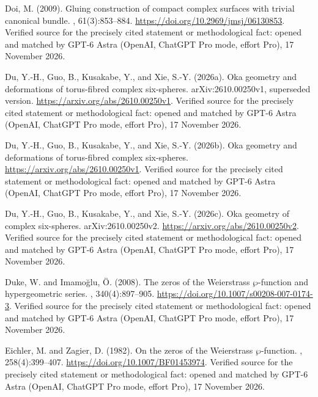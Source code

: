 \begin{thebibliography}{}
Doi, M. (2009).
\newblock Gluing construction of compact complex surfaces with trivial
  canonical bundle.
, 61(3):853--884.
\newblock \url{https://doi.org/10.2969/jmsj/06130853}. Verified source for the precisely cited statement or methodological fact: opened and matched by GPT-6 Astra (OpenAI, ChatGPT Pro mode, effort Pro), 17 November 2026.

Du, Y.-H., Guo, B., Kusakabe, Y., and Xie, S.-Y. (2026a).
\newblock Oka geometry and deformations of torus-fibred complex six-spheres.
\newblock arXiv:2610.00250v1, superseded version.
\newblock \url{https://arxiv.org/abs/2610.00250v1}. Verified source for the precisely cited statement or methodological fact: opened and matched by GPT-6 Astra (OpenAI, ChatGPT Pro mode, effort Pro), 17 November 2026.

Du, Y.-H., Guo, B., Kusakabe, Y., and Xie, S.-Y. (2026b).
\newblock Oka geometry and deformations of torus-fibred complex six-spheres.
\newblock \url{https://arxiv.org/abs/2610.00250v1}. Verified source for the precisely cited statement or methodological fact: opened and matched by GPT-6 Astra (OpenAI, ChatGPT Pro mode, effort Pro), 17 November 2026.

Du, Y.-H., Guo, B., Kusakabe, Y., and Xie, S.-Y. (2026c).
\newblock Oka geometry of complex six-spheres.
\newblock arXiv:2610.00250v2.
\newblock \url{https://arxiv.org/abs/2610.00250v2}. Verified source for the precisely cited statement or methodological fact: opened and matched by GPT-6 Astra (OpenAI, ChatGPT Pro mode, effort Pro), 17 November 2026.

Duke, W. and Imamo{\u g}lu, {\"O}. (2008).
\newblock The zeros of the {Weierstrass} {$\wp$}-function and hypergeometric
  series.
, 340(4):897--905.
\newblock \url{https://doi.org/10.1007/s00208-007-0174-3}. Verified source for the precisely cited statement or methodological fact: opened and matched by GPT-6 Astra (OpenAI, ChatGPT Pro mode, effort Pro), 17 November 2026.

Eichler, M. and Zagier, D. (1982).
\newblock On the zeros of the {Weierstrass} {$\wp$}-function.
, 258(4):399--407.
\newblock \url{https://doi.org/10.1007/BF01453974}. Verified source for the precisely cited statement or methodological fact: opened and matched by GPT-6 Astra (OpenAI, ChatGPT Pro mode, effort Pro), 17 November 2026.


\end{thebibliography}
